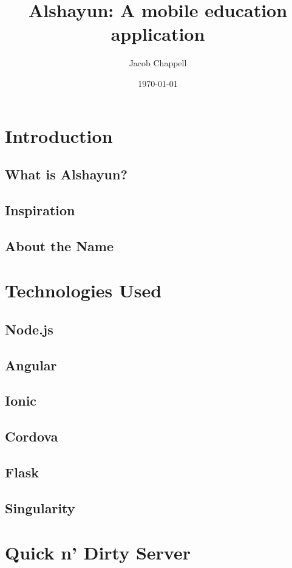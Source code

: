 \documentclass[12pt]{report}
\begin{document}
\title{Alshayun: A mobile education application}
\author{Jacob Chappell}
\date{\today}
\maketitle

\tableofcontents

\chapter{Introduction}
\section{What is Alshayun?}
\section{Inspiration}
\section{About the Name}

\chapter{Technologies Used}
\section{Node.js}
\section{Angular}
\section{Ionic}
\section{Cordova}
\section{Flask}
\section{Singularity}

\chapter{Quick n' Dirty Server}
\end{document}
